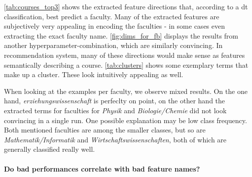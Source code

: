 \autoref{tab:courses_top3} shows the extracted feature directions that, according to a \gls{dt} classification, best predict a faculty. Many of the extracted features are subjectively very appealing in encoding the faculties - in some cases even extracting the exact faculty name. \autoref{fig:dims_for_fb} displays the results from another hyperparameter-combination, which are similarly convincing. In recommendation system, many of these directions would make sense as features semantically describing a course. \autoref{tab:clusters} shows some exemplary terms that make up a cluster. These look intuitively appealing as well.

When looking at the examples per faculty, we observe mixed results. On the one hand, \eg \textit{erziehungswissenschaft} is perfeclty on point, on the other hand the extracted terms for faculties for \textit{Physik} and \textit{Biologie/Chemie} did not look convincing in a single run. One possible explanation may be low class frequency. Both mentioned faculties are among the smaller classes, but so are \textit{Mathematik/Informatik} and \textit{Wirtschaftswissenschaften}, both of which are generally classified really well.







\paragraph{Do bad performances correlate with bad feature names?}



